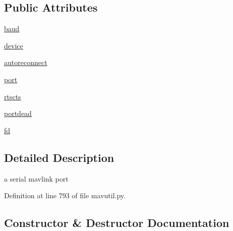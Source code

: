 \subsection*{Public Attributes}
\begin{DoxyCompactItemize}
\item 
\mbox{\hyperlink{classpymavlink_1_1mavutil_1_1mavserial_a30e81076e135f155338cdb028d634bdb}{baud}}
\item 
\mbox{\hyperlink{classpymavlink_1_1mavutil_1_1mavserial_a42ee22c9edea351a8228113efb0c1907}{device}}
\item 
\mbox{\hyperlink{classpymavlink_1_1mavutil_1_1mavserial_aec2ff119c2631f63d3608bd347133183}{autoreconnect}}
\item 
\mbox{\hyperlink{classpymavlink_1_1mavutil_1_1mavserial_a21eb82949b5d2a8f77da9b6b07a99962}{port}}
\item 
\mbox{\hyperlink{classpymavlink_1_1mavutil_1_1mavserial_af3469e2df31f9684e6603459dcae461d}{rtscts}}
\item 
\mbox{\hyperlink{classpymavlink_1_1mavutil_1_1mavserial_af651e06812c51cc77cd0617615050d94}{portdead}}
\item 
\mbox{\hyperlink{classpymavlink_1_1mavutil_1_1mavserial_a1a4e38937fe65a0c201ffa9f6e83d1d3}{fd}}
\end{DoxyCompactItemize}


\subsection{Detailed Description}
\begin{DoxyVerb}a serial mavlink port\end{DoxyVerb}
 

Definition at line 793 of file mavutil.\+py.



\subsection{Constructor \& Destructor Documentation}
\mbox{\label{classpymavlink_1_1mavutil_1_1mavserial_a58a367989819aa421781a816ce1586bb}} 
